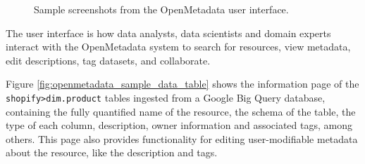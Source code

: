 \begin{figure}
    \centering
    

    \qquad

    
    \caption{Sample screenshots from the OpenMetadata user interface.}
\end{figure}

The user interface is how data analysts, data scientists and domain experts interact with the OpenMetadata system to search for resources, view metadata, edit descriptions, tag datasets, and collaborate.

Figure \ref{fig:openmetadata_sample_data_table} shows the information page of the \texttt{shopify>dim.product} tables ingested from a Google Big Query database, containing the fully quantified name of the resource, the schema of the table, the type of each column, description, owner information and associated tags, among others. This page also provides functionality for editing user-modifiable metadata about the resource, like the description and tags.

